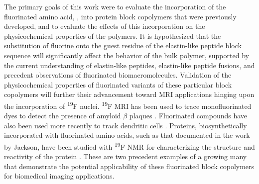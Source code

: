 \begin{refsection}
The primary goals of this work were to evaluate the incorporation of
the fluorinated amino acid, , into protein block
copolymers that were previously developed, and to evaluate the effects of this
incorporation on the physicochemical properties of the polymers.
It is hypothesized that the substitution of fluorine onto the guest residue of
the elastin-like peptide block sequence will significantly affect the behavior
of the bulk polymer, supported by the current understanding of elastin-like
peptides, elastin-like peptide fusions, and precedent observations of
fluorinated biomacromolecules. Validation of the physicochemical properties of
fluorinated variants of these particular block copolymers will further their
advancement toward MRI applications hinging upon the incorporation of
\textsuperscript{19}F nuclei. \textsuperscript{19}F MRI has been used to trace
monofluorinated dyes to detect the presence of amyloid ${\beta}$ plaques
.\cite{Higuchi2005} Fluorinated compounds have also been used
more recently to track dendritic cells  .\cite{Bonetto2010}
Proteins, biosynthetically incorporated with fluorinated amino acids, such as
that documented in the work by Jackson,\cite{Jackson2007} have been studied with
\textsuperscript{19}F NMR for characterizing the structure and reactivity of the
protein .  These are two precedent examples of a growing many
that demonstrate the potential applicability of these fluorinated block
copolymers for biomedical imaging applications.




\end{refsection}
